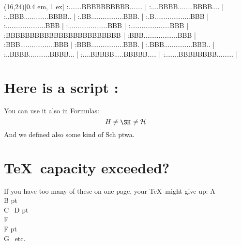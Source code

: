 \def\schwa{\FormOfSchwa\kern 1 pt} %
\sprite{\FormOfSchwa}(16,24)[0.4 em, 1 ex] %
:.......BBBBBBBBBB....... |
:....BBBB........BBBB.... |
:..BBB.............BBBB.. |
:.BB.................BBB. |
:.B...................BBB |
:.....................BBB |
:.....................BBB |
:.....................BBB |
:BBBBBBBBBBBBBBBBBBBBBBBB |
:BBB..................BBB |
:BBB..................BBB |
:BBB.................BBB. |
:.BBB...............BBB.. |
:..BBBB...........BBBB... |
:....BBBBB.....BBBBB..... |
:.......BBBBBBBB......... |
\endsprite

\section{Here is a script \protect\ScriptH :} %
You can use it also in Formulas:
$$ H \neq \ScriptH \neq {\cal H}$$
And we defined also some kind of Sch\schwa wa.

\newpage
\section{\TeX\ capacity exceeded?}
If you have too many of these on one page, your \TeX\ might give up:
A \ScriptH \\
B \schwa   \\
C \ScriptH \
D \schwa   \\
E \ScriptH \\
F \schwa   \\
G \ScriptH \ etc.

